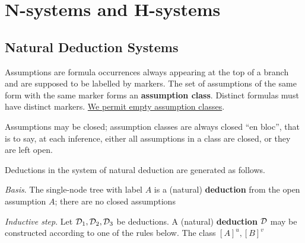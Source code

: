 \documentclass[11pt]{article}
\DeclareMathOperator{\Nm}{\textbf{Nm}}
\DeclareMathOperator{\Ni}{\textbf{Ni}}
\DeclareMathOperator{\Nc}{\textbf{Nc}}
\begin{document}
\section{N-systems and H-systems}
\label{sec:org23f11cf}
\subsection{Natural Deduction Systems}
\label{sec:org51751dc}
\begin{definition}[\textit{The systems} $\Nm,\Ni,\Nc$ ]
Assumptions are formula occurrences always appearing at the top of a branch
and are supposed to be labelled by markers. The set of assumptions of the
same form with the same marker forms an \textbf{assumption class}. Distinct formulas
must have distinct markers. \uline{We permit empty assumption classes}.

Assumptions may be closed; assumption classes are always closed ``en bloc'',
that is to say, at each inference, either all assumptions in a class are
closed, or they are left open.

Deductions in the system of natural deduction are generated as follows.

\noindent \emph{Basis}. The single-node tree with label \(A\) is a (natural) \textbf{deduction}
from the open assumption \(A\); there are no closed assumptions

\noindent \emph{Inductive step}. Let \(\mathcal{D}_1,\mathcal{D}_2,\mathcal{D}_3\) be deductions. A
(natural) \textbf{deduction} \(\mathcal{D}\) may be constructed according to one of the rules
below. The class \([A]^u,[B]^v\) 


\end{definition}
\end{document}
